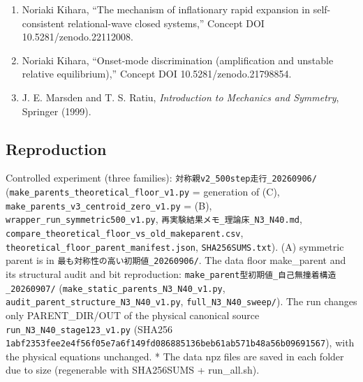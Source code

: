 \documentclass[
  a4paper,
]{ltjsarticle}
\providecommand{\tightlist}{%
  \setlength{\itemsep}{0pt}\setlength{\parskip}{0pt}}
\begin{document}
\begin{enumerate}
\def\labelenumi{\arabic{enumi}.}
\tightlist
\item
  Noriaki Kihara, ``The mechanism of inflationary rapid expansion in
  self-consistent relational-wave closed systems,'' Concept DOI
  10.5281/zenodo.22112008.
\item
  Noriaki Kihara, ``Onset-mode discrimination (amplification and
  unstable relative equilibrium),'' Concept DOI 10.5281/zenodo.21798854.
\item
  J. E. Marsden and T. S. Ratiu, \emph{Introduction to Mechanics and
  Symmetry}, Springer (1999).
\end{enumerate}

\subsection{Reproduction}\label{reproduction}

Controlled experiment (three families):
\texttt{対称親v2\_500step走行\_20260906/}
(\texttt{make\_parents\_theoretical\_floor\_v1.py} = generation of (C),
\texttt{make\_parents\_v3\_centroid\_zero\_v1.py} = (B),
\texttt{wrapper\_run\_symmetric500\_v1.py},
\texttt{再実験結果メモ\_理論床\_N3\_N40.md},
\texttt{compare\_theoretical\_floor\_vs\_old\_makeparent.csv},
\texttt{theoretical\_floor\_parent\_manifest.json},
\texttt{SHA256SUMS.txt}). (A) symmetric parent is in
\texttt{最も対称性の高い初期値\_20260906/}. The data floor make\_parent
and its structural audit and bit reproduction:
\texttt{make\_parent型初期値\_自己無撞着構造\_20260907/}
(\texttt{make\_static\_parents\_N3\_N40\_v1.py},
\texttt{audit\_parent\_structure\_N3\_N40\_v1.py},
\texttt{full\_N3\_N40\_sweep/}). The run changes only PARENT\_DIR/OUT of
the physical canonical source \texttt{run\_N3\_N40\_stage123\_v1.py}
(SHA256
\texttt{1abf2353fee2e4f56f05e7a6f149fd086885136beb61ab571b48a56b09691567}),
with the physical equations unchanged. * The data npz files are saved in
each folder due to size (regenerable with SHA256SUMS + run\_all.sh).
\end{document}
